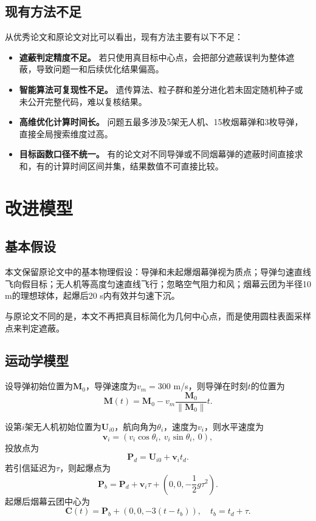 \documentclass[12pt,a4paper]{article}
\begin{document}
\subsection{现有方法不足}

从优秀论文和原论文对比可以看出，现有方法主要有以下不足：
\begin{itemize}
\item \textbf{遮蔽判定精度不足。} 若只使用真目标中心点，会把部分遮蔽误判为整体遮蔽，导致问题一和后续优化结果偏高。
\item \textbf{智能算法可复现性不足。} 遗传算法、粒子群和差分进化若未固定随机种子或未公开完整代码，难以复核结果。
\item \textbf{高维优化计算时间长。} 问题五最多涉及5架无人机、15枚烟幕弹和3枚导弹，直接全局搜索维度过高。
\item \textbf{目标函数口径不统一。} 有的论文对不同导弹或不同烟幕弹的遮蔽时间直接求和，有的计算时间区间并集，结果数值不可直接比较。
\end{itemize}

\section{改进模型}

\subsection{基本假设}

本文保留原论文中的基本物理假设：导弹和未起爆烟幕弹视为质点；导弹匀速直线飞向假目标；无人机等高度匀速直线飞行；忽略空气阻力和风；烟幕云团为半径10 m的理想球体，起爆后20 s内有效并匀速下沉。

与原论文不同的是，本文不再把真目标简化为几何中心点，而是使用圆柱表面采样点来判定遮蔽。

\subsection{运动学模型}

设导弹初始位置为$\boldsymbol M_0$，导弹速度为$v_m=300$ m/s，则导弹在时刻$t$的位置为
\begin{equation}
\boldsymbol M(t)=\boldsymbol M_0-v_m\frac{\boldsymbol M_0}{\|\boldsymbol M_0\|}t.
\end{equation}

设第$i$架无人机初始位置为$\boldsymbol U_{i0}$，航向角为$\theta_i$，速度为$v_i$，则水平速度为
\begin{equation}
\boldsymbol v_i=(v_i\cos\theta_i,\ v_i\sin\theta_i,\ 0),
\end{equation}
投放点为
\begin{equation}
\boldsymbol P_{d}=\boldsymbol U_{i0}+\boldsymbol v_i t_d.
\end{equation}
若引信延迟为$\tau$，则起爆点为
\begin{equation}
\boldsymbol P_b=\boldsymbol P_d+\boldsymbol v_i\tau+\left(0,0,-\frac{1}{2}g\tau^2\right).
\end{equation}
起爆后烟幕云团中心为
\begin{equation}
\boldsymbol C(t)=\boldsymbol P_b+(0,0,-3(t-t_b)),\quad t_b=t_d+\tau.
\end{equation}
\end{document}
